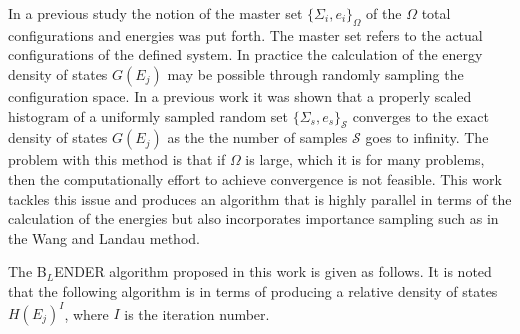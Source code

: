 \documentclass[aps,prl,reprint,superscriptaddress,showkeys]{revtex4-1}
\begin{document}
  In a previous study\cite{partition} the notion of the master set $\{ \Sigma_i, e_i \}_\Omega $ of the $\Omega$ total configurations and energies was put forth. The master set refers to the actual configurations of the defined system. In practice the calculation of the energy density of states $G(E_j)$  may  be possible through randomly sampling the configuration space.  In a previous work it was shown that a properly scaled histogram of a uniformly sampled random set $\{ \Sigma_s, e_s \}_\mathcal{S}$ converges to the exact density of states $G(E_j)$ as the the number of samples $\mathcal{S}$ goes to infinity. The problem with this method is that if $\Omega$ is large, which it is for many problems,  then the computationally effort to achieve convergence is not feasible.  This work tackles this issue and produces an algorithm that is highly parallel in terms of the calculation of the energies  but also incorporates importance sampling such as in the Wang and Landau method.
   
The B$_{L}$ENDER algorithm proposed in this work  is given as follows. It is noted that the following algorithm is in terms of producing a relative density of states $H(E_j)^I$, where $I$ is the iteration number. 
\end{document}
